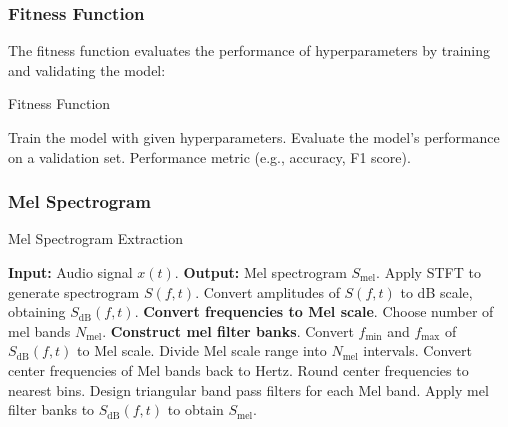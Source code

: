 \subsubsection{Fitness Function}
The fitness function evaluates the performance of hyperparameters by training and validating the model:

\begin{algorithm}[H]
\caption{Fitness Function}
\begin{algorithmic}[1]
\STATE Train the model with given hyperparameters.
\STATE Evaluate the model's performance on a validation set.
\RETURN Performance metric (e.g., accuracy, F1 score).
\end{algorithmic}
\end{algorithm}

\subsubsection{Mel Spectrogram}
\begin{algorithm}[H]
    \caption{Mel Spectrogram Extraction}
    \begin{algorithmic}[1]
        
    \STATE \textbf{Input:} Audio signal $x(t)$. 
    \STATE \textbf{Output:} Mel spectrogram $S_{\text{mel}}$.
    \STATE Apply STFT to generate spectrogram $S(f, t)$. 
    \STATE Convert amplitudes of $S(f, t)$ to dB scale, obtaining $S_{\text{dB}}(f, t)$.
    \STATE \textbf{Convert frequencies to Mel scale}. 
    \STATE \hspace{10} Choose number of mel bands $N_{\text{mel}}$.
    \STATE \textbf{Construct mel filter banks}.
        \STATE \hspace{10} Convert $f_{\text{min}}$ and $f_{\text{max}}$ of $S_{\text{dB}}(f, t)$ to Mel scale. 
        \STATE \hspace{10} Divide Mel scale range into $N_{\text{mel}}$ intervals. 
        \STATE \hspace{10} Convert center frequencies of Mel bands back to Hertz. 
        \STATE \hspace{10} Round center frequencies to nearest bins. 
        \STATE \hspace{10} Design triangular band pass filters for each Mel band. 
        \STATE \hspace{10} Apply mel filter banks to $S_{\text{dB}}(f, t)$ to obtain $S_{\text{mel}}$. 
    \end{algorithmic}
\end{algorithm}


